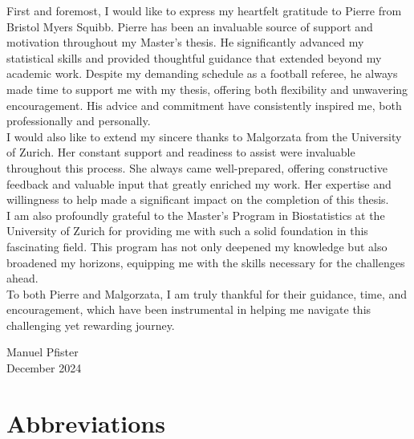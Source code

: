 \documentclass[11pt, a4paper]{article}\usepackage[]{graphicx}\usepackage[]{xcolor}
\begin{document}
First and foremost, I would like to express my heartfelt gratitude to Pierre from Bristol Myers Squibb. Pierre has been an invaluable source of support and motivation throughout my Master's thesis. He significantly advanced my statistical skills and provided thoughtful guidance that extended beyond my academic work. Despite my demanding schedule as a football referee, he always made time to support me with my thesis, offering both flexibility and unwavering encouragement. His advice and commitment have consistently inspired me, both professionally and personally.\\

\noindent I would also like to extend my sincere thanks to Malgorzata from the University of Zurich. Her constant support and readiness to assist were invaluable throughout this process. She always came well-prepared, offering constructive feedback and valuable input that greatly enriched my work. Her expertise and willingness to help made a significant impact on the completion of this thesis.\\

\noindent I am also profoundly grateful to the Master's Program in Biostatistics at the University of Zurich for providing me with such a solid foundation in this fascinating field. This program has not only deepened my knowledge but also broadened my horizons, equipping me with the skills necessary for the challenges ahead.\\

\noindent To both Pierre and Malgorzata, I am truly thankful for their guidance, time, and encouragement, which have been instrumental in helping me navigate this challenging yet rewarding journey.\\

\vspace{1cm}
\hfill
\begin{minipage}{0.4\textwidth}
\raggedleft
Manuel Pfister\\
December 2024
\end{minipage}

\newpage


\tableofcontents
\newpage


\section*{Abbreviations}
\end{document}
